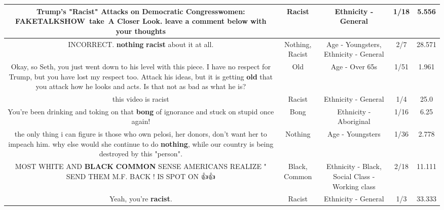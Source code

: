 \documentclass[11pt]{article}
\newlength\mylength
\begin{document}
\begin{center}
\begin{longtable}{|C{.65\mylength}|C{.30\mylength}|C{.12\mylength}|C{.12\mylength}|C{.12\mylength}|}
  \small Trump's "\textbf{Racist}" Attacks on Democratic Congresswomen: FAKETALKSHOW take A Closer Look. leave a comment below with your thoughts\normalsize   & Racist & Ethnicity - General & 1/18 & 5.556 \\  \hline
  \small INCORRECT. \textbf{nothing} \textbf{racist} about it at all.\normalsize   & Nothing, Racist & Age - Youngsters, Ethnicity - General & 2/7 & 28.571 \\  \hline
  \small Okay, so Seth, you just went down to his level with this piece. I have no respect for Trump, but you have lost my respect too. Attack his ideas, but it is getting \textbf{old} that you attack how he looks and acts. Is that not as bad as what he is?\normalsize   & Old & Age - Over 65s & 1/51 & 1.961 \\  \hline
  \small this video is racist\normalsize   & Racist & Ethnicity - General & 1/4 & 25.0 \\  \hline
  \small You're been drinking and toking on that \textbf{bong} of ignorance and stuck on stupid once again!\normalsize   & Bong & Ethnicity - Aboriginal & 1/16 & 6.25 \\  \hline
  \small the only thing i can figure is those who own pelosi, her donors, don't want her to impeach him. why else would she continue to do \textbf{nothing}, while our country is being destroyed by this "person".\normalsize   & Nothing & Age - Youngsters & 1/36 & 2.778 \\  \hline
  \small MOST WHITE AND \textbf{BLACK} \textbf{COMMON} SENSE AMERICANS REALIZE " SEND THEM M.F. BACK !  IS SPOT ON 👍👍\normalsize   & Black, Common & Ethnicity - Black, Social Class - Working class & 2/18 & 11.111 \\  \hline
  \small Yeah, you're \textbf{racist}.\normalsize   & Racist & Ethnicity - General & 1/3 & 33.333 \\  \hline

\end{longtable}
\end{center}
\end{document}
